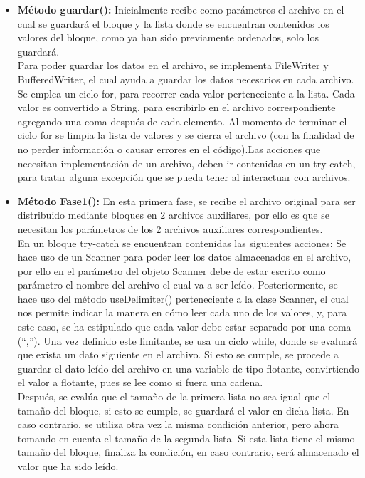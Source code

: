 \documentclass[12pt,letterpaper]{article}
\begin{document}
\begin{large}
\begin{itemize}[noitemsep,topsep=0pt]
\item\textbf{Método guardar():} Inicialmente recibe como parámetros el archivo en el cual se guardará el bloque y la lista donde se encuentran contenidos los valores del bloque, como ya han sido previamente ordenados, solo los guardará.\\
Para poder guardar los datos en el archivo, se implementa FileWriter y BufferedWriter, el cual ayuda a guardar los datos necesarios en cada archivo. Se emplea un ciclo for, para recorrer cada valor perteneciente a la lista. Cada valor es convertido a String, para escribirlo en el archivo correspondiente agregando una coma después de cada elemento. Al momento de terminar el ciclo for se limpia la lista de valores y se cierra el archivo (con la finalidad de no perder información o causar errores en el código).Las acciones que necesitan implementación de un archivo, deben ir contenidas en un try-catch, para tratar alguna excepción que se pueda tener al interactuar con archivos.
\item\textbf{Método Fase1():}  En esta primera fase, se recibe el archivo original para ser distribuido mediante bloques en 2 archivos auxiliares, por ello es que se necesitan los parámetros de los 2 archivos auxiliares correspondientes. \\
En un bloque try-catch se encuentran contenidas las siguientes acciones: Se hace uso de un Scanner para poder leer los datos almacenados en el archivo, por ello en el parámetro del objeto Scanner debe de estar escrito como parámetro el nombre del archivo el cual va a ser leído. \newpage
Posteriormente, se hace uso del método useDelimiter() perteneciente a la clase Scanner, el cual nos permite indicar la manera en cómo leer cada uno de los valores, y, para este caso, se ha estipulado que cada valor debe estar separado por una coma (“,”).
Una vez definido este limitante, se usa un ciclo while, donde se evaluará que exista un dato siguiente en el archivo. Si esto se cumple, se procede a guardar el dato leído del archivo en una variable de tipo flotante, convirtiendo el valor a flotante, pues se lee como si fuera una cadena. \\
Después, se evalúa que el tamaño de la primera lista no sea igual que el tamaño del bloque, si esto se cumple, se guardará el valor en dicha lista. En caso contrario, se utiliza otra vez la misma condición anterior, pero ahora tomando en cuenta el tamaño de la segunda lista. Si esta lista tiene el mismo tamaño del bloque, finaliza la condición, en caso contrario, será almacenado el valor que ha sido leído. 

\end{itemize}
\end{large}
\end{document}

